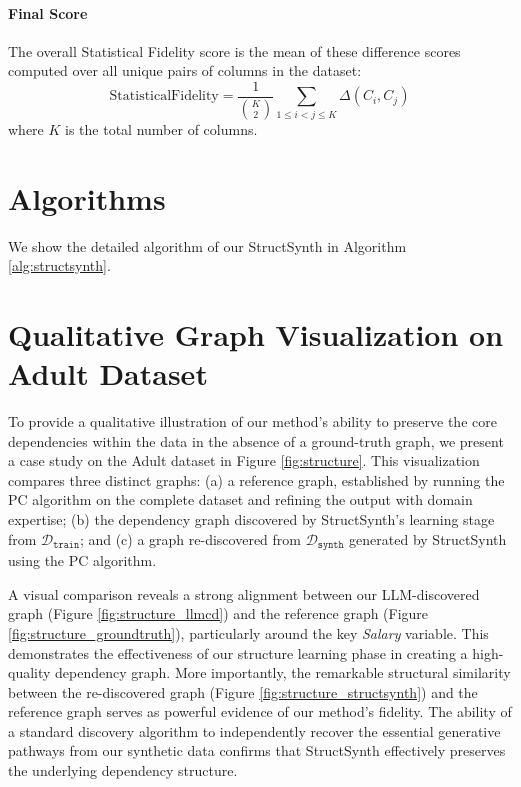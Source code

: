 \paragraph{Final Score}
The overall Statistical Fidelity score is the mean of these difference scores computed over all unique pairs of columns in the dataset:
\begin{equation}
    \text{StatisticalFidelity} = \frac{1}{\binom{K}{2}} \sum_{1 \le i < j \le K} \Delta(C_i, C_j)
\end{equation}
where $K$ is the total number of columns.



\section{Algorithms}
\label{app:algorithm}
We show the detailed algorithm of our \textsf{StructSynth} in Algorithm \ref{alg:structsynth}.


\section{Qualitative Graph Visualization on Adult Dataset}
\label{app:adult_graph}

To provide a qualitative illustration of our method's ability to preserve the core dependencies within the data in the absence of a ground-truth graph, we present a case study on the Adult dataset in Figure \ref{fig:structure}. This visualization compares three distinct graphs: (a) a reference graph, established by running the PC algorithm on the complete dataset and refining the output with domain expertise; (b) the dependency graph discovered by \textsf{StructSynth}'s learning stage from $\mathcal{D}_\mathtt{train}$; and (c) a graph re-discovered from $\mathcal{D}_\mathtt{synth}$ generated by \textsf{StructSynth} using the PC algorithm.


A visual comparison reveals a strong alignment between our LLM-discovered graph (Figure \ref{fig:structure_llmcd}) and the reference graph (Figure \ref{fig:structure_groundtruth}), particularly around the key \textit{Salary} variable. This demonstrates the effectiveness of our structure learning phase in creating a high-quality dependency graph. More importantly, the remarkable structural similarity between the re-discovered graph (Figure \ref{fig:structure_structsynth}) and the reference graph serves as powerful evidence of our method's fidelity. The ability of a standard discovery algorithm to independently recover the essential generative pathways from our synthetic data confirms that \textsf{StructSynth} effectively preserves the underlying dependency structure.

